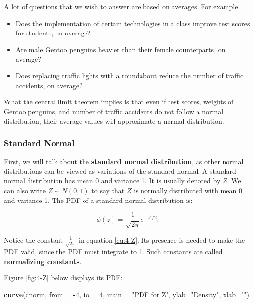 \documentclass[
]{book}
\newenvironment{Shaded}{\begin{snugshade}}{\end{snugshade}}
\newcommand{\AttributeTok}[1]{\textcolor[rgb]{0.13,0.29,0.53}{#1}}
\newcommand{\DecValTok}[1]{\textcolor[rgb]{0.00,0.00,0.81}{#1}}
\newcommand{\FunctionTok}[1]{\textcolor[rgb]{0.13,0.29,0.53}{\textbf{#1}}}
\newcommand{\NormalTok}[1]{#1}
\newcommand{\SpecialCharTok}[1]{\textcolor[rgb]{0.81,0.36,0.00}{\textbf{#1}}}
\newcommand{\StringTok}[1]{\textcolor[rgb]{0.31,0.60,0.02}{#1}}
\providecommand{\tightlist}{%
  \setlength{\itemsep}{0pt}\setlength{\parskip}{0pt}}
\begin{document}
A lot of questions that we wish to answer are based on averages. For example

\begin{itemize}
\tightlist
\item
  Does the implementation of certain technologies in a class improve test scores for students, on average?
\item
  Are male Gentoo penguins heavier than their female counterparts, on average?
\item
  Does replacing traffic lights with a roundabout reduce the number of traffic accidents, on average?
\end{itemize}

What the central limit theorem implies is that even if test scores, weights of Gentoo penguins, and number of traffic accidents do not follow a normal distribution, their average values will approximate a normal distribution.

\hypertarget{standard-normal}{%
\subsubsection{Standard Normal}\label{standard-normal}}

First, we will talk about the \textbf{standard normal distribution}, as other normal distributions can be viewed as variations of the standard normal. A standard normal distribution has mean 0 and variance 1. It is usually denoted by \(Z\). We can also write \(Z \sim N(0,1)\) to say that \(Z\) is normally distributed with mean 0 and variance 1. The PDF of a standard normal distribution is:

\begin{equation} 
\phi(z) = \frac{1}{\sqrt{2 \pi}} e^{-z^2/2}.
\label{eq:4-Z}
\end{equation}

Notice the constant \(\frac{1}{\sqrt{2 \pi}}\) in equation \eqref{eq:4-Z}. Its presence is needed to make the PDF valid, since the PDF must integrate to 1. Such constants are called \textbf{normalizing constants}.

Figure \ref{fig:4-Z} below displays its PDF:

\begin{Shaded}
\begin{Highlighting}[]
\FunctionTok{curve}\NormalTok{(dnorm, }\AttributeTok{from =} \SpecialCharTok{{-}}\DecValTok{4}\NormalTok{, }\AttributeTok{to =} \DecValTok{4}\NormalTok{, }\AttributeTok{main =} \StringTok{"PDF for Z"}\NormalTok{, }\AttributeTok{ylab=}\StringTok{"Density"}\NormalTok{, }\AttributeTok{xlab=}\StringTok{""}\NormalTok{)}
\end{Highlighting}
\end{Shaded}
\end{document}
